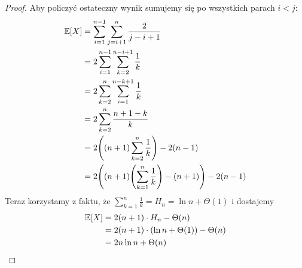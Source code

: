 \begin{proof}
	Aby policzyć ostateczny wynik sumujemy się po wszystkich parach \( i < j \):
	\begin{align*}
		\expected{X}
		 & = \sum_{i=1}^{n-1} \sum_{j=i+1}^{n} \frac{2}{j - i + 1}         \\
		 & = 2\sum_{i=1}^{n-1} \sum_{k=2}^{n-i+1} \frac{1}{k}              \\
		 & = 2\sum_{k=2}^n \sum_{i=1}^{n-k+1} \frac{1}{k}                  \\
		 & = 2\sum_{k=2}^n \frac{n+1-k}{k}                                 \\
		 & = 2\pars{(n+1)\sum_{k=2}^n \frac{1}{k}} - 2(n-1)                \\
		 & = 2\pars{(n+1)\pars{\sum_{k=1}^n \frac{1}{k}} - (n+1)} - 2(n-1)
	\end{align*}
	Teraz korzystamy z faktu, że \( \sum_{k=1}^n \frac{1}{k} = H_n = \ln n + \Theta(1) \) i dostajemy
	\begin{align*}
		\expected{X}
		 & = 2(n+1)\cdot H_n - \Theta(n)                     \\
		 & = 2(n+1)\cdot\pars{\ln n + \Theta(1)} - \Theta(n) \\
		 & = 2n \ln n + \Theta(n)
	\end{align*}
\end{proof}

